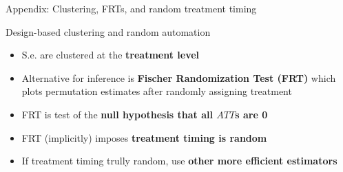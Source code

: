 \documentclass[aspectratio=169]{beamer}
\begin{document}




\begin{frame}
\begin{center}
{\Large Appendix: Clustering, FRTs, and random treatment timing}
\end{center}
\end{frame}

\begin{frame}{Design-based clustering and random automation} \label{clustering}
\begin{itemize}
 \item<1-> S.e. are clustered at the \textbf{treatment level} \medskip
 \item<1-> Alternative for inference is \textbf{Fischer Randomization Test (FRT)} which plots permutation estimates after randomly assigning treatment \medskip
 \item<1-> FRT is test of the \textbf{null hypothesis that all $ATT$s are 0} \medskip
 \item<2-> FRT (implicitly) imposes \textbf{treatment timing is random} \medskip
 \item<2-> If treatment timing trully random, use \textbf{other more efficient estimators}
\end{itemize}
\end{frame}

\end{document}
